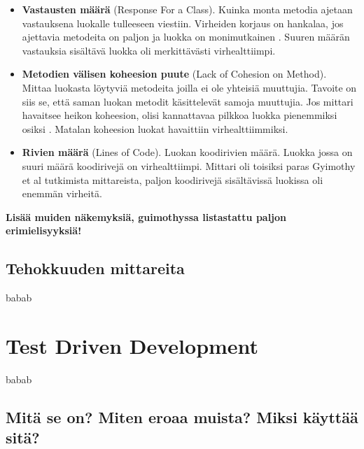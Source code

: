 \documentclass[finnish]{tktltiki2}
\theoremstyle{definition}
\theoremstyle{remark}
\begin{document}
\begin{itemize}
  \item \textbf{Vastausten määrä} (Response For a Class). Kuinka monta metodia ajetaan vastauksena luokalle tulleeseen viestiin. Virheiden korjaus on hankalaa, jos ajettavia metodeita on paljon ja luokka on monimutkainen \cite{Chidamber94}. Suuren määrän vastauksia sisältävä luokka oli merkittävästi virhealttiimpi. \cite{Gyimothy05}

  \item \textbf{Metodien välisen koheesion puute} (Lack of Cohesion on Method). Mittaa luokasta löytyviä metodeita joilla ei ole yhteisiä muuttujia. Tavoite on siis se, että saman luokan metodit käsittelevät samoja muuttujia. Jos mittari havaitsee heikon koheesion, olisi kannattavaa pilkkoa luokka pienemmiksi osiksi \cite{Chidamber94}. Matalan koheesion luokat havaittiin virhealttiimmiksi. \cite{Gyimothy05}

  \item \textbf{Rivien määrä} (Lines of Code). Luokan koodirivien määrä.  Luokka jossa on suuri määrä koodirivejä on virhealttiimpi. Mittari oli toisiksi paras Gyimothy et al tutkimista mittareista, paljon koodirivejä sisältävissä luokissa oli enemmän virheitä. \cite{Gyimothy05}








\end{itemize}

\textbf{Lisää muiden näkemyksiä, guimothyssa listastattu paljon erimielisyyksiä! \cite{Gyimothy05}}




\subsection{Tehokkuuden mittareita}

babab

\section{Test Driven Development}


babab

\subsection{Mitä se on? Miten eroaa muista? Miksi käyttää sitä?}
\end{document}
